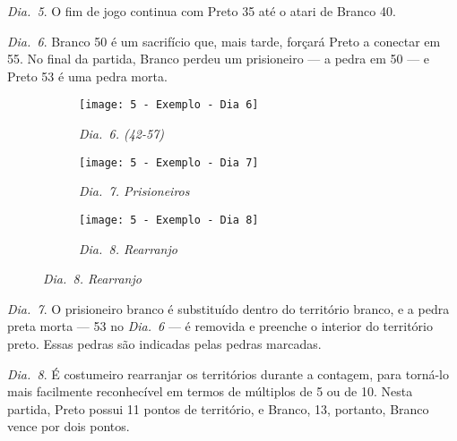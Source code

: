 \emph{Dia.\@~5}. O fim de jogo continua com Preto 35 até o atari de Branco 40.

\emph{Dia.\@~6}. Branco 50 é um sacrifício que, mais tarde, forçará Preto a conectar em 55. No final da partida, Branco perdeu um prisioneiro --- a pedra em 50 --- e Preto 53 é uma pedra morta.

\begin{figure}[h!]
  \centering
  \begin{subfigure}[t]{.3\textwidth}
    \centering
    \texttt{[image: 5 - Exemplo - Dia 6]}
    \captionsetup{justification=centering}
    \caption*{\emph{Dia.\@~6. (42-57)}}
  \end{subfigure}
  \hfill
  \begin{subfigure}[t]{.3\textwidth}
    \centering
    \texttt{[image: 5 - Exemplo - Dia 7]}
    \captionsetup{justification=centering}
    \caption*{\emph{Dia.\@~7. Prisioneiros}}
  \end{subfigure}
  \hfill
  \begin{subfigure}[t]{.3\textwidth}
    \centering
    \texttt{[image: 5 - Exemplo - Dia 8]}
    \captionsetup{justification=centering}
    \caption*{\emph{Dia.\@~8. Rearranjo}}
  \end{subfigure}
\end{figure}

\emph{Dia.\@~7}. O prisioneiro branco é substituído dentro do território branco, e a pedra preta morta --- 53 no \emph{Dia.\@~6} --- é removida e preenche o interior do território preto. Essas pedras são indicadas pelas pedras marcadas.

\emph{Dia.\@~8}. É costumeiro rearranjar os territórios durante a contagem, para torná-lo mais facilmente reconhecível em termos de múltiplos de 5 ou de 10. Nesta partida, Preto possui 11 pontos de território, e Branco, 13, portanto, Branco vence por dois pontos.